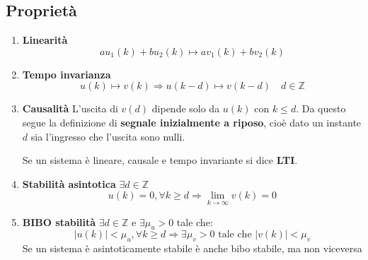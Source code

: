 \documentclass[a4paper]{article}
\begin{document}
\subsection{Proprietà}
\begin{enumerate}
  \item \textbf{Linearità}
    \[
      a u_1(k) + b u_2(k) \mapsto a v_1(k) + b v_2(k)
    \] 
    
  \item \textbf{Tempo invarianza}
    \[
      u(k) \mapsto v(k) \Rightarrow u(k - d) \mapsto v(k - d) \quad d \in \mathbb{Z}
    \] 

  \item \textbf{Causalità}
    L'uscita di \( v(d) \) dipende solo da \( u(k) \) con \( k \le d \). Da questo
    segue la definizione di \textbf{segnale inizialmente a riposo}, cioè dato
    un instante \( d \) sia l'ingresso che l'uscita sono nulli.

    \vspace{1em}
    \noindent
    Se un sistema è lineare, causale e tempo invariante si dice \textbf{LTI}.

  \item \textbf{Stabilità asintotica} \( \exists d \in \mathbb{Z} \) 
    \[
      u(k) = 0, \forall k \ge d \Rightarrow \lim_{k \to \infty} v(k) = 0
    \] 

  \item \textbf{BIBO stabilità} $\exists d \in \mathbb{Z}$ e $\exists \mu_u > 0$ tale che:
    \[
      |u(k)| < \mu_u, \forall k \ge d \Rightarrow \exists \mu_v > 0 \text{ tale che } |v(k)| < \mu_v
    \] 
    Se un sistema è asintoticamente stabile è anche bibo stabile, ma non viceversa
\end{enumerate}
\end{document}
